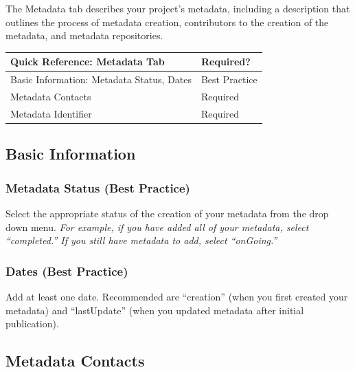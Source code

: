 \documentclass[
]{book}
\begin{document}
The Metadata tab describes your project's metadata, including a description that outlines the process of metadata creation, contributors to the creation of the metadata, and metadata repositories.

\begin{longtable}[]{@{}ll@{}}
\toprule
Quick Reference: Metadata Tab & Required?\tabularnewline
\midrule
\endhead
Basic Information: Metadata Status, Dates & Best Practice\tabularnewline
Metadata Contacts & Required\tabularnewline
Metadata Identifier & Required\tabularnewline
\bottomrule
\end{longtable}

\hypertarget{basic-information-1}{%
\subsection*{Basic Information}\label{basic-information-1}}

\hypertarget{metadata-status-best-practice}{%
\subsubsection*{Metadata Status (Best Practice)}\label{metadata-status-best-practice}}

Select the appropriate status of the creation of your metadata from the drop down menu. \emph{For example, if you have added all of your metadata, select ``completed.'' If you still have metadata to add, select ``onGoing.''}

\hypertarget{dates-best-practice-1}{%
\subsubsection*{Dates (Best Practice)}\label{dates-best-practice-1}}

Add at least one date. Recommended are ``creation'' (when you first created your metadata) and ``lastUpdate'' (when you updated metadata after initial publication).

\hypertarget{metadata-contacts}{%
\subsection*{Metadata Contacts}\label{metadata-contacts}}
\end{document}
